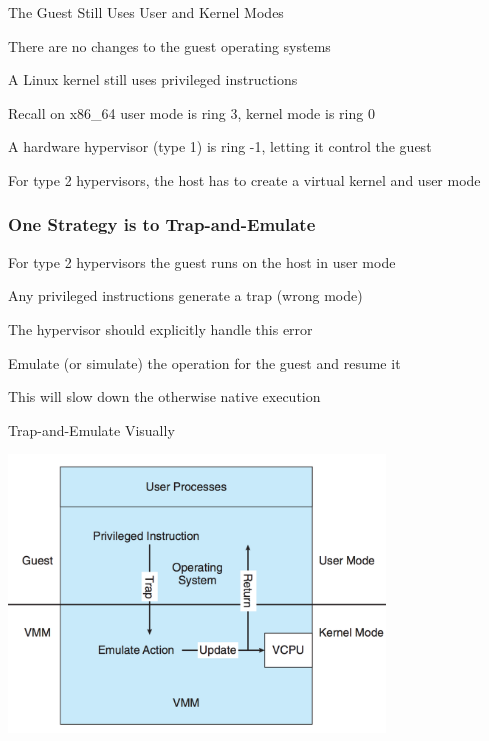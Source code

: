   \begin{frame}{The Guest Still Uses User and Kernel Modes}

    There are no changes to the guest operating systems

    \hspace{2em} A Linux kernel still uses privileged instructions

    \vspace{2em}

    Recall on x86\_64 user mode is ring 3, kernel mode is ring 0

    \hspace{2em} A hardware hypervisor (type 1) is ring -1, letting it control the guest

    \vspace{2em}

    For type 2 hypervisors, the host has to create a virtual kernel and user mode
  \end{frame}

  \begin{frame}
    \frametitle{One Strategy is to Trap-and-Emulate}

    For type 2 hypervisors the guest runs on the host in user mode

    \hspace{2em} Any privileged instructions generate a trap (wrong mode)

    \vspace{2em}

    The hypervisor should explicitly handle this error

    \hspace{2em} Emulate (or simulate) the operation for the guest and resume it

    \vspace{2em}

    This will slow down the otherwise native execution
  \end{frame}

  \begin{frame}{Trap-and-Emulate Visually}
    \begin{center}
      \includegraphics[width=0.75\textwidth]{trap-and-emulate.png}
    \end{center}
  \end{frame}

